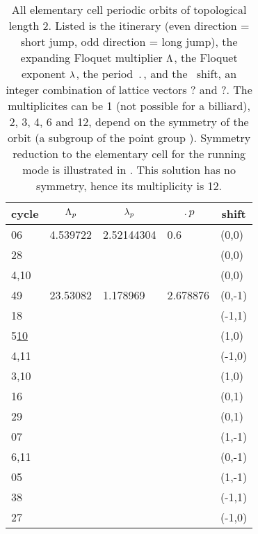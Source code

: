 

\begin{table}
\centering
\caption[]{
All elementary cell periodic orbits of topological length 2. Listed is
the itinerary (even direction = short jump, odd direction = long jump),
the expanding Floquet multiplier $\Lambda$,
the Floquet exponent $\lambda$,
the period $\period{}$,
and
the \rpo\ shift, an integer combination of lattice vectors ? and ?. The
multiplicites can be 1 (not possible for a billiard), 2, 3, 4, 6 and 12,
depend on the symmetry of the orbit (a subgroup of the point group ).
Symmetry reduction to the elementary cell for the running mode 
is illustrated in . This solution has no
symmetry, hence its multiplicity is 12.
    }
    \begin{tabular}{l|r|l|l|l}
    \multicolumn{1}{c}{cycle}
    & \multicolumn{1}{|c|}{$\Lambda_p$}
      & \multicolumn{1}{c|}{$\lambda_p$}
       & \multicolumn{1}{c|}{$\period{p}$}
          & \multicolumn{1}{c}{shift} \\
    \hline
06  & 4.539722 & 2.52144304
                 & 0.6      & (0,0)  \\
28  &          & &          & (0,0)  \\
4,10  &        & &          & (0,0) \\
    \hline
49   & 23.53082 & 1.178969
                 & 2.678876 & (0,-1) \\
18   &         & &          & (-1,1)   \\
5\underline{10} &         & &          & (1,0)  \\
4,11 &         & &          & (-1,0)  \\
3,10 &         & &          & (1,0)  \\
16 &           & &          & (0,1) \\
29 &           & &          & (0,1) \\
07 &           & &          & (1,-1) \\
6,11 &         & &          & (0,-1)  \\
05 &           & &          & (1,-1) \\
38 &           & &          & (-1,1) \\
27 &           & &          & (-1,0)  \\

\end{tabular}
\end{table}
